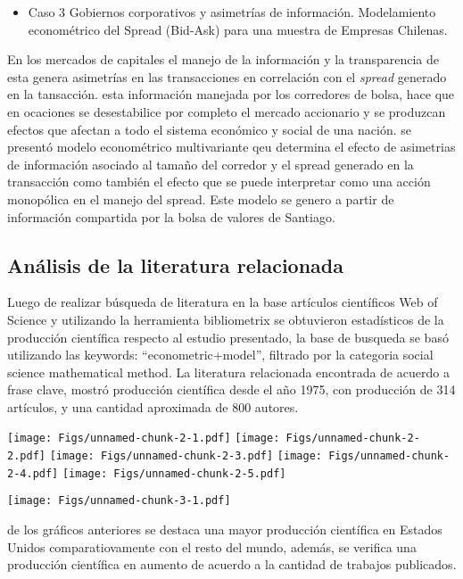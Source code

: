 \documentclass[
  american,
]{article}
\providecommand{\tightlist}{%
  \setlength{\itemsep}{0pt}\setlength{\parskip}{0pt}}
\begin{document}
\begin{itemize}
\tightlist
\item
  Caso 3 Gobiernos corporativos y asimetrías de información.
  Modelamiento econométrico del Spread (Bid-Ask) para una muestra de
  Empresas Chilenas.
\end{itemize}

En los mercados de capitales el manejo de la información y la
transparencia de esta genera asimetrías en las transacciones en
correlación con el \emph{spread} generado en la tansacción. esta
información manejada por los corredores de bolsa, hace que en ocaciones
se desestabilice por completo el mercado accionario y se produzcan
efectos que afectan a todo el sistema económico y social de una nación.
se presentó modelo econométrico multivariante qeu determina el efecto de
asimetrias de información asociado al tamaño del corredor y el spread
generado en la transacción como también el efecto que se puede
interpretar como una acción monopólica en el manejo del spread. Este
modelo se genero a partir de información compartida por la bolsa de
valores de Santiago.

\hypertarget{anuxe1lisis-de-la-literatura-relacionada}{%
\subsection{Análisis de la literatura
relacionada}\label{anuxe1lisis-de-la-literatura-relacionada}}

Luego de realizar búsqueda de literatura en la base artículos
científicos Web of Science y utilizando la herramienta bibliometrix se
obtuvieron estadísticos de la producción científica respecto al estudio
presentado, la base de busqueda se basó utilizando las keywords:
``econometric+model'', filtrado por la categoria social science
mathematical method. La literatura relacionada encontrada de acuerdo a
frase clave, mostró producción científica desde el año 1975, con
producción de 314 artículos, y una cantidad aproximada de 800 autores.

\texttt{[image: Figs/unnamed-chunk-2-1.pdf]}
\texttt{[image: Figs/unnamed-chunk-2-2.pdf]}
\texttt{[image: Figs/unnamed-chunk-2-3.pdf]}
\texttt{[image: Figs/unnamed-chunk-2-4.pdf]}
\texttt{[image: Figs/unnamed-chunk-2-5.pdf]}

\texttt{[image: Figs/unnamed-chunk-3-1.pdf]}

de los gráficos anteriores se destaca una mayor producción científica en
Estados Unidos comparatiovamente con el resto del mundo, además, se
verifica una producción científica en aumento de acuerdo a la cantidad
de trabajos publicados.
\end{document}
